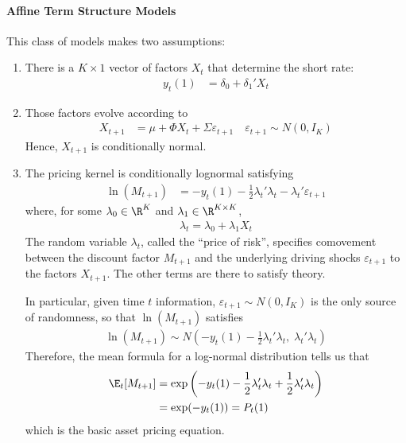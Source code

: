 \documentclass[12pt]{article}
\theoremstyle{plain}
\theoremstyle{definition}
\theoremstyle{remark}
\begin{document}
\clearpage
\begin{multicols*}{2}
\paragraph{Affine Term Structure Models}
This class of models makes two assumptions:
\begin{enumerate}[label=(\roman*)]
  \item There is a $K\times 1$ vector of factors $X_t$ that determine
    the short rate:
    \begin{align*}
      y_t(1) &= \delta_0 + \delta_1' X_t
    \end{align*}
  \item Those factors evolve according to
    \begin{align*}
      X_{t+1} &= \mu + \Phi X_t + \Sigma \varepsilon_{t+1}
      \quad
      \varepsilon_{t+1}
      \sim N(0,I_K)
    \end{align*}
    Hence, $X_{t+1}$ is conditionally normal.

  \item
    The pricing kernel is conditionally lognormal satisfying
    \begin{align*}
      \ln(M_{t+1})
      &=
      -y_t(1) - \frac{1}{2}\lambda_t'\lambda_t
      - \lambda_t'\varepsilon_{t+1}
    \end{align*}
    where, for some $\lambda_0\in \R^K$ and
    $\lambda_1\in\R^{K\times K}$,
    \begin{align*}
      \lambda_t = \lambda_0 + \lambda_1 X_t
    \end{align*}
    The random variable $\lambda_t$, called the ``price of risk'',
    specifies comovement between the discount factor $M_{t+1}$ and the
    underlying driving shocks $\varepsilon_{t+1}$ to the factors
    $X_{t+1}$. The other terms are there to satisfy theory.

    In particular, given time $t$ information,
    $\varepsilon_{t+1}\sim N(0,I_K)$ is the only source of randomness,
    so that $\ln(M_{t+1})$ satisfies
    \begin{align*}
      \ln(M_{t+1})
      \sim
      N\left(
      -y_t(1)-\frac{1}{2}\lambda_t'\lambda_t
      ,\; \lambda_t'\lambda_t
      \right)
    \end{align*}
    Therefore, the mean formula for a log-normal distribution tells us
    that
    \begin{align*}
      \E_t[M_{t+1}]
      &= \exp\left(-y_t(1)
        -\frac{1}{2}\lambda_t'\lambda_t
        +\frac{1}{2}\lambda_t'\lambda_t
      \right)
      \\
      &= \exp(-y_t(1))
      = P_t(1)
    \end{align*}
    which is the basic asset pricing equation.
\end{enumerate}
\columnbreak

\end{multicols*}
\end{document}
